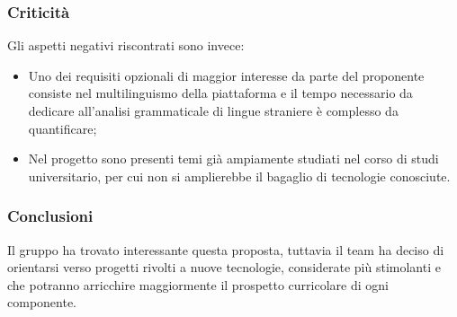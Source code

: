 \subsubsection{Criticità}
Gli aspetti negativi riscontrati sono invece:
\begin{itemize}
	\item Uno dei requisiti opzionali di maggior interesse da parte del
	 proponente consiste nel multilinguismo della piattaforma e il tempo
	 necessario da dedicare all'analisi grammaticale di lingue straniere è
	 complesso da quantificare;
	
	\item Nel progetto sono presenti temi già ampiamente studiati nel corso di
	 studi universitario, per cui non si amplierebbe il bagaglio di
	 tecnologie conosciute.
 	
\end{itemize}
\subsubsection{Conclusioni}
Il gruppo ha trovato interessante questa proposta, tuttavia il team ha deciso
di orientarsi verso progetti rivolti a nuove tecnologie, considerate più
stimolanti e che potranno arricchire maggiormente il prospetto curricolare 
di ogni componente. 


